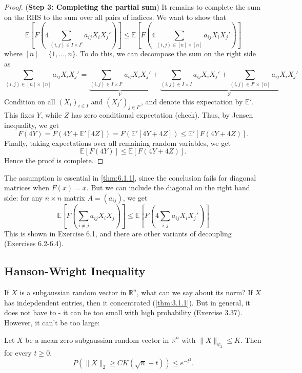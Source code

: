 \begin{proof}
(\textbf{Step 3: Completing the partial sum}) It remains to complete the sum on the RHS to the sum over all 
pairs of indices. We want to show that 
\[ \mathbb{E} \left[ F \left( 4 \sum_{(i, j) \in I \times I^c}^{} a_{ij}X_iX_j' \right) \right] \leq 
\mathbb{E} \left[ F \left( 4 \sum_{(i, j) \in [n] \times [n]}^{} a_{ij}X_iX_j' \right) \right] \]
where $[n] = \{1, \dots, n\}$. To do this, we can decompose the sum on the right side as 
\[ \sum_{(i, j) \in [n] \times [n]}^{} a_{ij}X_iX_j' 
= \underbrace{ \sum_{(i, j) \in I \times I^c}^{} a_{ij}X_iX_j' }_{Y} 
+ \underbrace{\sum_{(i, j) \in I \times I}^{} a_{ij}X_iX_j' 
+ \sum_{(i, j) \in I^c \times [n]}^{} a_{ij}X_iX_j'}_{Z}\]
Condition on all $(X_i)_{i \in I}$ and $(X_j')_{j \in I^c}$, and denote this expectation by $\mathbb{E}'$. 
This fixes $Y$, while $Z$ has zero conditional expectation (check). Thus, by Jensen inequality, we get 
\[ F(4Y) = F(4Y + \mathbb{E}'[4Z]) = F(\mathbb{E}'[4Y + 4Z]) \leq \mathbb{E}'[F(4Y + 4Z)]. \]
Finally, taking expectations over all remaining random variables, we get 
\[ \mathbb{E}[F(4Y)] \leq \mathbb{E}[F(4Y + 4Z)]. \]
Hence the proof is complete.
\end{proof}

\begin{remark}
\label{rmk:6.1.2}
The assumption is essential in \cref{thm:6.1.1}, since the conclusion fails for diagonal matrices when 
$F(x) = x$. But we can include the diagonal on the right hand side: for any $n \times n$ matrix $A = (a_{ij})$, 
we get 
\[ \mathbb{E}\left[ F \left( \sum_{i \neq j}^{} a_{ij}X_iX_j \right) \right] 
\leq \mathbb{E}\left[ F \left( 4 \sum_{i, j}^{} a_{ij}X_iX_j' \right) \right] \]
This is shown in Exercise 6.1, and there are other variants of decoupling (Exercises 6.2-6.4).
\end{remark}



\subsection{Hanson-Wright Inequality}
If $X$ is a subgaussian random vector in $\mathbb{R}^n$, what can we say about its norm? If $X$ has 
indepdendent entries, then it concentrated (\cref{thm:3.1.1}). But in general, it does not have to - it can be 
too small with high probability (Exercise 3.37). However, it can't be too large:

\begin{proposition}
\label{prop:6.2.1}
Let $X$ be a mean zero subgaussian random vector in $\mathbb{R}^n$ with $\lVert X \rVert_{\psi_2} \leq K$. Then 
for every $t \geq 0$, 
\[ P(\lVert X \rVert_{2} \geq CK(\sqrt{n} + t)) \leq e^{-t^2}. \]
\end{proposition}

